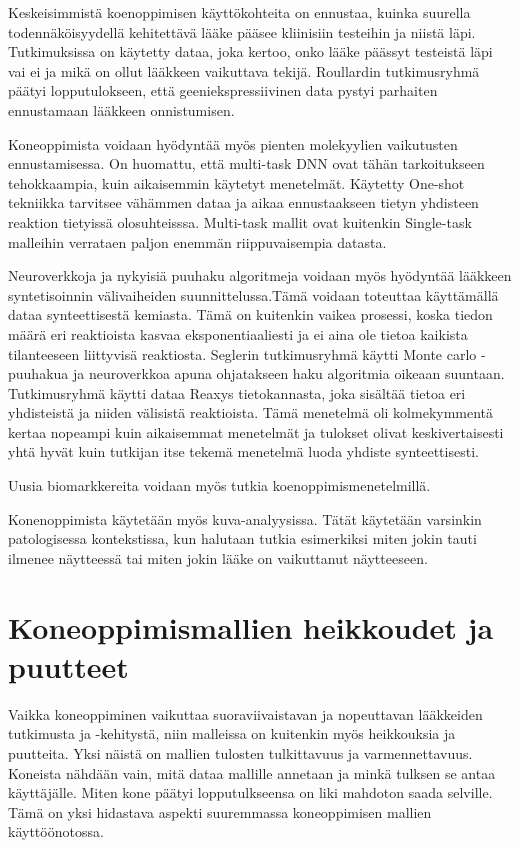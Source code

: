 \documentclass[finnish,twoside,censored,essay,sw-line]{HYthesisML}
\begin{document}
Keskeisimmistä koenoppimisen käyttökohteita on ennustaa, kuinka suurella todennäköisyydellä kehitettävä lääke
pääsee kliinisiin testeihin ja niistä läpi. Tutkimuksissa on käytetty dataa, joka kertoo, onko lääke päässyt
testeistä läpi vai ei ja mikä on ollut lääkkeen vaikuttava tekijä. Roullardin tutkimusryhmä päätyi lopputulokseen,
että geeniekspressiivinen data pystyi parhaiten ennustamaan lääkkeen onnistumisen.

Koneoppimista voidaan hyödyntää myös pienten molekyylien vaikutusten ennustamisessa. On huomattu, että
multi-task DNN ovat tähän tarkoitukseen tehokkaampia, kuin aikaisemmin käytetyt menetelmät. Käytetty
One-shot tekniikka tarvitsee vähämmen dataa ja aikaa ennustaakseen tietyn yhdisteen reaktion tietyissä
olosuhteisssa. Multi-task mallit ovat kuitenkin Single-task malleihin verrataen paljon enemmän riippuvaisempia
datasta.

Neuroverkkoja ja nykyisiä puuhaku algoritmeja voidaan myös hyödyntää lääkkeen syntetisoinnin välivaiheiden
suunnittelussa.Tämä voidaan toteuttaa käyttämällä dataa synteettisestä kemiasta. Tämä on kuitenkin vaikea
prosessi, koska tiedon määrä eri reaktioista kasvaa eksponentiaaliesti ja ei aina ole tietoa kaikista
tilanteeseen liittyvisä reaktiosta. Seglerin tutkimusryhmä käytti Monte carlo -puuhakua ja neuroverkkoa apuna
ohjatakseen haku algoritmia oikeaan suuntaan. Tutkimusryhmä käytti dataa Reaxys tietokannasta, joka sisältää
tietoa eri yhdisteistä ja niiden välisistä reaktioista. Tämä menetelmä oli kolmekymmentä kertaa nopeampi kuin
aikaisemmat menetelmät ja tulokset olivat keskivertaisesti yhtä hyvät kuin tutkijan itse tekemä menetelmä
luoda yhdiste synteettisesti.

Uusia biomarkkereita voidaan myös tutkia koenoppimismenetelmillä.

Konenoppimista käytetään myös kuva-analyysissa. Tätät käytetään varsinkin patologisessa kontekstissa, kun
halutaan tutkia esimerkiksi miten jokin tauti ilmenee näytteessä tai miten jokin lääke on vaikuttanut näytteeseen.

\chapter{Koneoppimismallien heikkoudet ja puutteet}

Vaikka koneoppiminen vaikuttaa suoraviivaistavan ja nopeuttavan lääkkeiden tutkimusta ja -kehitystä, niin
malleissa on kuitenkin myös heikkouksia ja puutteita. Yksi näistä on mallien tulosten tulkittavuus ja varmennettavuus.
Koneista nähdään vain, mitä dataa mallille annetaan ja minkä tulksen se antaa käyttäjälle. Miten kone päätyi
lopputulkseensa on liki mahdoton saada selville. Tämä on yksi hidastava aspekti suuremmassa koneoppimisen mallien
käyttöönotossa.
\end{document}
